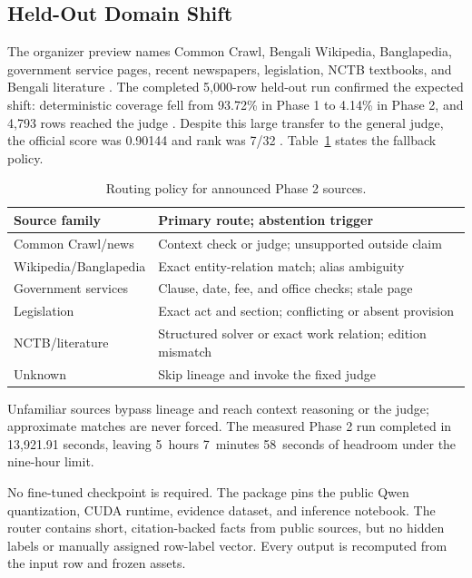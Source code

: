 \documentclass[11pt]{article}
\begin{document}
\subsection{Held-Out Domain Shift}

The organizer preview names Common Crawl, Bengali Wikipedia, Banglapedia, government service pages, recent newspapers, legislation, NCTB textbooks, and Bengali literature \citep{phase2}. The completed 5,000-row held-out run confirmed the expected shift: deterministic coverage fell from 93.72\% in Phase 1 to 4.14\% in Phase 2, and 4,793 rows reached the judge \citep{phase2run}. Despite this large transfer to the general judge, the official score was 0.90144 and rank was 7/32 \citep{phase2results}. Table~\ref{tab:shift} states the fallback policy.

\begin{table}[t]
\caption{Routing policy for announced Phase 2 sources.}
\label{tab:shift}
\centering
\small
\begin{tabularx}{\columnwidth}{@{}p{}X@{}}
\toprule
Source family & Primary route; abstention trigger \\
\midrule
Common Crawl/news & Context check or judge; unsupported outside claim \\
Wikipedia/\allowbreak Banglapedia & Exact entity-relation match; alias ambiguity \\
Government services & Clause, date, fee, and office checks; stale page \\
Legislation & Exact act and section; conflicting or absent provision \\
NCTB/literature & Structured solver or exact work relation; edition mismatch \\
Unknown & Skip lineage and invoke the fixed judge \\
\bottomrule
\end{tabularx}
\end{table}

Unfamiliar sources bypass lineage and reach context reasoning or the judge; approximate matches are never forced. The measured Phase 2 run completed in 13,921.91 seconds, leaving 5~hours 7~minutes 58~seconds of headroom under the nine-hour limit.

No fine-tuned checkpoint is required. The package pins the public Qwen quantization, CUDA runtime, evidence dataset, and inference notebook. The router contains short, citation-backed facts from public sources, but no hidden labels or manually assigned row-label vector. Every output is recomputed from the input row and frozen assets.
\end{document}
